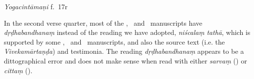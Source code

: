 \begin{ekdosis}
\begin{testimonia}[hp02_002]
\begin{versinnote}
\end{versinnote}

\emph{Yogacintāmaṇi} f.~17r

\begin{versinnote}
\end{versinnote}

\end{testimonia}

\begin{philcomm}[hp02_002]
In the second verse quarter, most of the \textalpha, \textbeta\ and \textgamma\ manuscripts have \emph{dṛḍhabandhanaṃ} instead of the reading we have adopted, \emph{niścalaṃ tathā}, which is supported by some \textbeta, \textdelta\ and \texteta\ manuscripts, and also the source text (i.e. the \emph{Vivekamārtaṇḍa}) and testimonia. The reading \emph{dṛḍhabandhanaṃ} appears to be a dittographical error and does not make sense when read with either \emph{sarvaṃ} (\textalpha) or \emph{cittaṃ} (\textgamma).


\end{philcomm}
\end{ekdosis}
